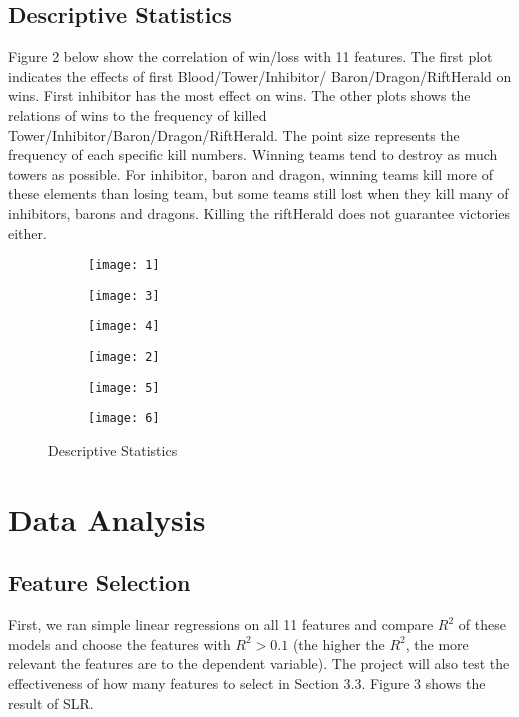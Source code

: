 \documentclass[10.5pt]{article}
\begin{document}
\subsection{Descriptive Statistics}
Figure 2 below show the correlation of win/loss with 11 features. The first plot indicates the effects of first Blood/Tower/Inhibitor/ Baron/Dragon/RiftHerald on wins. First inhibitor has the most effect on wins. The other plots shows the relations of wins to the frequency of killed Tower/Inhibitor/Baron/Dragon/RiftHerald. The point size represents the frequency of each specific kill numbers. Winning teams tend to destroy as much towers as possible. For inhibitor, baron and dragon, winning teams kill more of these elements than losing team, but some teams still lost when they kill many of inhibitors, barons and dragons. Killing the riftHerald does not guarantee victories either.


\begin{figure}[h]
    \centering
    \begin{subfigure}[b]{0.2\textwidth}
        \texttt{[image: 1]}
    \end{subfigure}
    \begin{subfigure}[b]{0.33\textwidth}
        \texttt{[image: 3]}
    \end{subfigure}
    \begin{subfigure}[b]{0.33\textwidth}
        \texttt{[image: 4]}
    \end{subfigure}
    \begin{subfigure}[b]{0.2\textwidth}
        \texttt{[image: 2]}
    \end{subfigure}
    \begin{subfigure}[b]{0.33\textwidth}
        \texttt{[image: 5]}
    \end{subfigure}
    \begin{subfigure}[b]{0.33\textwidth}
        \texttt{[image: 6]}
    \end{subfigure}
    \caption{Descriptive Statistics}
\end{figure}


\section{Data Analysis}
\subsection{Feature Selection}
First, we ran simple linear regressions on all 11 features and compare $R^2$ of these models and choose the features with $R^2>0.1$ (the higher the $R^2$, the more relevant the features are to the dependent variable). The project will also test the effectiveness of how many features to select in Section 3.3. Figure 3 shows the result of SLR. 
\end{document}
